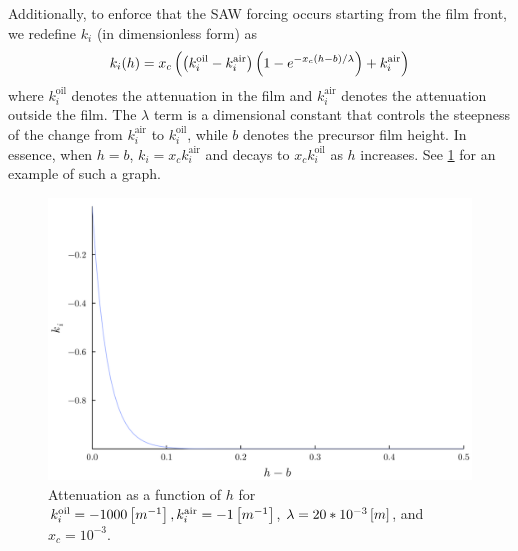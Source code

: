 Additionally, to enforce that the SAW forcing occurs starting from the film front, we redefine 
$k_i$ (in dimensionless form) as 
\begin{align}
    k_i\!\left( h \right) = x_c \left( \left( k_i^{\text{oil}} - k_i^{\text{air}} \right)\left( 1 - e^{-x_c(h-b)/\lambda} \right) + k_i^{\text{air}} \right)
    \label{eq:k_i}
\end{align}
where $k_i^{\text{oil}}$ denotes the attenuation in the film and $k_i^{\text{air}}$ denotes the attenuation
outside the film. The $\lambda$ term is a dimensional constant that controls the steepness of the change from $k_i^{\text{air}}$ to $k_i^{\text{oil}}$, 
while $b$ denotes the precursor film height. In essence, when $h = b$, $k_i = x_c k_i^{\text{air}}$ and  
decays to $x_c k_i^{\text{oil}}$ as $h$ increases. See \cref{fig:attenuation} for an example of such a graph. 

\begin{figure}[ht]
    \centering
    \includegraphics[scale=0.25]{images/report/attenuation.png}
    \caption{Attenuation as a function of $h$ for $k_i^{\text{oil}} = -1000 \left[ m^{-1} \right], k_i^{\text{air}} = -1 \left[ m^{-1} \right]$, 
    $\lambda = 20*10^{-3} \left[ m \right]$, and $x_c = 10^{-3}$.} 
    \label{fig:attenuation}
\end{figure}